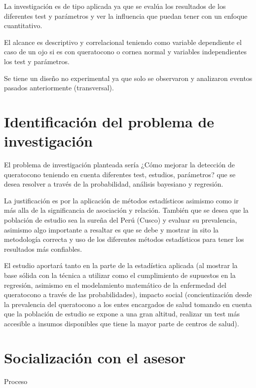 La investigación es de tipo aplicada ya que se evalúa los resultados de los diferentes test y parámetros y ver la influencia que puedan tener con un enfoque cuantitativo.

El alcance es descriptivo y correlacional teniendo como variable dependiente el caso de un ojo si es con queratocono o cornea normal y variables independientes los test y parámetros.

Se tiene un diseño no experimental ya que solo se observaron y analizaron eventos pasados anteriormente (transversal).

\section{Identificación del problema de investigación}

El problema de investigación planteada sería ¿Cómo mejorar la detección de queratocono teniendo en cuenta diferentes test, estudios, parámetros? que se desea resolver a través de la probabilidad, análisis bayesiano y regresión.

La justificación es por la aplicación de métodos estadísticos asimismo como ir más alla de la significancia de asociación y relación. También que se desea que la población de estudio sea la sureña del Perú (Cusco) y evaluar su prevalencia, asimismo algo importante a resaltar es que se debe y mostrar in sito la metodología correcta y uso de los diferentes métodos estadísticos para tener los resultados más confiables.

El estudio aportará tanto en la parte de la estadística aplicada (al mostrar la base sólida con la técnica a utilizar como el cumplimiento de supuestos en la regresión, asimismo en el modelamiento matemático de la enfermedad del queratocono a través de las probabilidades), impacto social (concientización desde la prevalencia del queratocono a los entes encargados de salud tomando en cuenta que la población de estudio se expone a una gran altitud, realizar un test más accesible a insumos disponibles que tiene la mayor parte de centros de salud).

\section{Socialización con el asesor}
Proceso

